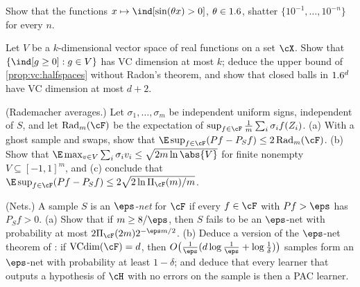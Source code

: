 \begin{refsection}
\begin{exercises}
\item \consolidation\hard Show that the functions $x\mapsto\ind[\sin(\theta x)>0]$, $\theta\in1.6$, shatter $\{10^{-1},\dots,10^{-n}\}$ for every $n$. \label{exr:vc:sine}

\item \consolidation\hard Let $V$ be a $k$-dimensional vector space of real functions on a set $\cX$. Show that $\{\ind[g\ge0]: g\in V\}$ has VC dimension at most $k$; deduce the upper bound of \cref{prop:vc:halfspaces} without Radon's theorem, and show that closed balls in $1.6^d$ have VC dimension at most $d+2$. \label{exr:vc:dudley}

\item \transfer\hard (Rademacher averages.) Let $\sigma_1,\dots,\sigma_m$ be independent uniform signs, independent of $S$, and let $\vcRad_m(\cF)$ be the expectation of $\sup_{f\in\cF}\frac1m\sum_{i}\sigma_if(Z_i)$. (a) With a ghost sample and swaps, show that $\E\sup_{f\in\cF}(Pf-P_Sf)\le2\vcRad_m(\cF)$. (b) Show that $\E\max_{v\in V}\sum_i\sigma_iv_i\le\sqrt{2m\ln\abs{V}}$ for finite nonempty $V\subseteq[-1,1]^m$, and (c) conclude that $\E\sup_{f\in\cF}(Pf-P_Sf)\le2\sqrt{2\ln\vcGrowth_{\cF}(m)/m}$. \label{exr:vc:rademacher}

\item \transfer\hard (Nets.) A sample $S$ is an \emph{$\eps$-net} for $\cF$ if every $f\in\cF$ with $Pf>\eps$ has $P_Sf>0$. (a) Show that if $m\ge8/\eps$, then $S$ fails to be an $\eps$-net with probability at most $2\vcGrowth_{\cF}(2m)2^{-\eps m/2}$. (b) Deduce a version of the $\eps$-net theorem of \textcite{HausslerWelzl1987}: if $\vcdim(\cF) = d$, then $O\big(\frac1\eps(d\log\frac1\eps+\log\frac1\delta)\big)$ samples form an $\eps$-net with probability at least $1-\delta$; and deduce that every learner that outputs a hypothesis of $\cH$ with no errors on the sample is then a PAC learner. \label{exr:vc:nets}


\end{exercises}
\end{refsection}
